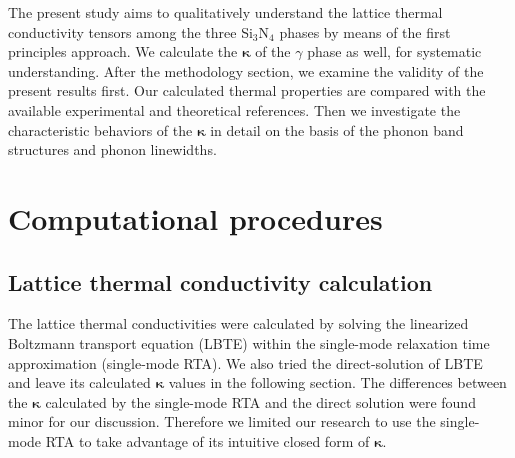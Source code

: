 \documentclass[twocolumn,amsmath,amssymb,a4paper,prb,superscriptaddress,floatfix]{revtex4-1}
\begin{document}
The present study aims to qualitatively understand the lattice thermal
conductivity tensors among the three Si$_3$N$_4$ phases by means of the first
principles approach.  We calculate the $\boldsymbol{\kappa}$ of the $\gamma$
phase as well, for systematic understanding. After the methodology section, we
examine the validity of the present results first.  Our calculated thermal
properties are compared with the available experimental and theoretical
references.  Then we investigate the characteristic behaviors of the 
$\boldsymbol{\kappa}$ in detail on the basis of the phonon band structures and
phonon linewidths.

\section{Computational procedures}

\subsection{Lattice thermal conductivity calculation}

The lattice thermal conductivities were calculated by solving the linearized
Boltzmann transport equation (LBTE) within the single-mode relaxation time
approximation (single-mode RTA).  We also tried the direct-solution of
LBTE~\cite{chaput-direct} and leave its calculated $\boldsymbol{\kappa}$ values
in the following section. The differences between the
$\boldsymbol{\kappa}$ calculated by the single-mode RTA and the direct solution
were found minor for our discussion. Therefore we limited our research to use
the single-mode RTA to take advantage of its intuitive closed form of
$\boldsymbol{\kappa}$.
\end{document}
